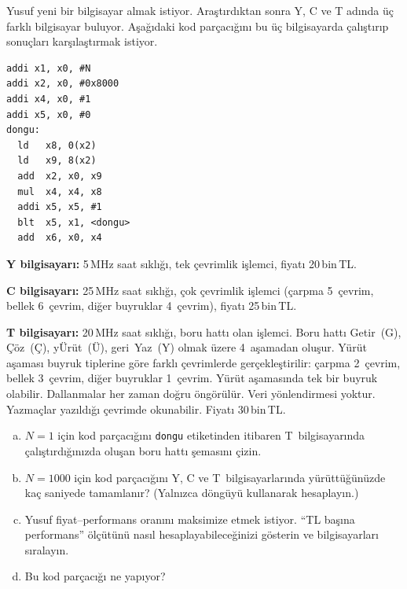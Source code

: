 \begin{alistirma}[\zor]
Yusuf yeni bir bilgisayar almak istiyor. Araştırdıktan sonra Y, C ve T adında üç farklı bilgisayar buluyor. Aşağıdaki kod parçacığını bu üç bilgisayarda çalıştırıp sonuçları karşılaştırmak istiyor.

\begin{lstlisting}[style=riscv, style=alistirma-kod]
addi x1, x0, #N
addi x2, x0, #0x8000
addi x4, x0, #1
addi x5, x0, #0
dongu:
  ld   x8, 0(x2)
  ld   x9, 8(x2)
  add  x2, x0, x9
  mul  x4, x4, x8
  addi x5, x5, #1
  blt  x5, x1, <dongu>
  add  x6, x0, x4
\end{lstlisting}

\textbf{Y bilgisayarı:} 5\,MHz saat sıklığı, tek çevrimlik işlemci, fiyatı 20\,bin\,TL.

\textbf{C bilgisayarı:} 25\,MHz saat sıklığı, çok çevrimlik işlemci (çarpma 5~çevrim, bellek 6~çevrim, diğer buyruklar 4~çevrim), fiyatı 25\,bin\,TL.

\textbf{T bilgisayarı:} 20\,MHz saat sıklığı, boru hattı olan işlemci. Boru hattı Getir~(G), Çöz~(Ç), yÜrüt~(Ü), geri~Yaz~(Y) olmak üzere 4~aşamadan oluşur. Yürüt aşaması buyruk tiplerine göre farklı çevrimlerde gerçekleştirilir: çarpma 2~çevrim, bellek 3~çevrim, diğer buyruklar 1~çevrim. Yürüt aşamasında tek bir buyruk olabilir. Dallanmalar her zaman doğru öngörülür. Veri yönlendirmesi yoktur. Yazmaçlar yazıldığı çevrimde okunabilir. Fiyatı 30\,bin\,TL.

\begin{enumerate}[(a)]
    \item $N = 1$ için kod parçacığını \texttt{dongu} etiketinden itibaren T~bilgisayarında çalıştırdığınızda oluşan boru hattı şemasını çizin.
    \item $N = 1000$ için kod parçacığını Y, C ve T~bilgisayarlarında yürüttüğünüzde kaç saniyede tamamlanır? (Yalnızca döngüyü kullanarak hesaplayın.)
    \item Yusuf fiyat--performans oranını maksimize etmek istiyor. ``TL başına performans'' ölçütünü nasıl hesaplayabileceğinizi gösterin ve bilgisayarları sıralayın.
    \item Bu kod parçacığı ne yapıyor?
\end{enumerate}
\end{alistirma}


